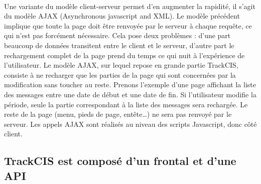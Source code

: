 			\paragraph{}%
			Une variante du modèle client-serveur permet d'en augmenter la rapidité, il
			s'agit du modèle AJAX (Asynchronous javascript and XML).
			Le modèle précédent implique que toute la page doit être renvoyée par le
			serveur à chaque requête, ce qui n'est pas forcément nécessaire. Cela pose
			deux problèmes :
			d'une part beaucoup de données transitent entre le client et le serveur,
			d'autre part le rechargement complet de la page prend du temps ce qui nuit à
			l'expérience de l'utilisateur.
			Le modèle AJAX, sur lequel repose en grande partie TrackCIS, consiste à ne
			recharger que les parties de la page qui sont concernées par la modification
			sans toucher au reste.
			Prenons l'exemple d'une page affichant la liste des messages entre
			une date de début et une date de fin. Si l'utilisateur modifie la période,
			seule la partie correspondant à la liste des messages sera rechargée. Le
			reste de la page (menu, pieds de page, entête\ldots) ne sera pas renvoyé par
			le serveur. Les appels AJAX sont réalisés au niveau des scripts Javascript,
			donc côté client.
			
		\subsection{TrackCIS est composé d'un frontal et d'une API}
